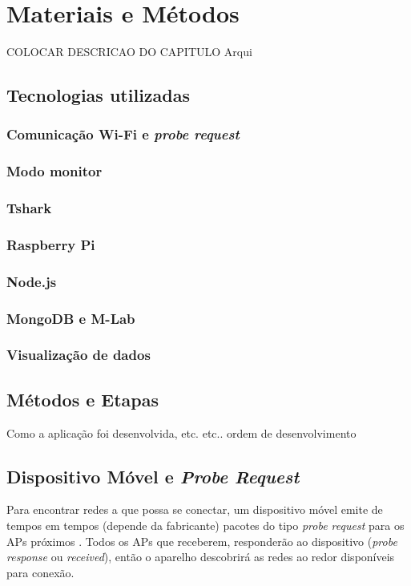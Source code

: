 
\chapter{Materiais e Métodos}
\label{metodologia}
COLOCAR DESCRICAO DO CAPITULO Arqui

\section{Tecnologias utilizadas}
\label{tecnologias-usadas}

\subsection{Comunicação Wi-Fi e \emph{probe request}}

\subsection{Modo monitor}

\subsection{Tshark}

\subsection{Raspberry Pi}

\subsection{Node.js}

\subsection{MongoDB e M-Lab}

\subsection{Visualização de dados}

\section{Métodos e Etapas}
Como a aplicação foi desenvolvida, etc. etc.. ordem de desenvolvimento


\section{Dispositivo Móvel e \emph{Probe Request}}
\label{smartphone-probe}
Para encontrar redes a que possa se conectar, um dispositivo móvel emite de tempos em tempos (depende da fabricante) pacotes do tipo \emph{probe request} para os APs próximos \cite{Meraki}. Todos os APs que receberem, responderão ao dispositivo (\emph{probe response} ou \emph{received}), então o aparelho descobrirá as redes ao redor disponíveis para conexão.

